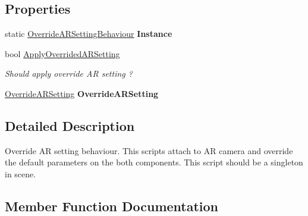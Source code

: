 \subsection*{Properties}
\begin{DoxyCompactItemize}
\item 
\mbox{\label{class_ximmerse_1_1_slide_in_s_d_k_1_1_override_a_r_setting_behaviour_a404805032e84b1cb04fb95e196e51f42}} 
static \mbox{\hyperlink{class_ximmerse_1_1_slide_in_s_d_k_1_1_override_a_r_setting_behaviour}{Override\+A\+R\+Setting\+Behaviour}} {\bfseries Instance}
\item 
bool \mbox{\hyperlink{class_ximmerse_1_1_slide_in_s_d_k_1_1_override_a_r_setting_behaviour_a0e54e87a54de821cf2b3f07fe7b93398}{Apply\+Overrided\+A\+R\+Setting}}
\begin{DoxyCompactList}\small\item\em Should apply override AR setting ? \end{DoxyCompactList}\item 
\mbox{\label{class_ximmerse_1_1_slide_in_s_d_k_1_1_override_a_r_setting_behaviour_ab186d144aee8aca46c1d9ddfced772e4}} 
\mbox{\hyperlink{class_ximmerse_1_1_slide_in_s_d_k_1_1_override_a_r_setting}{Override\+A\+R\+Setting}} {\bfseries Override\+A\+R\+Setting}
\end{DoxyCompactItemize}


\subsection{Detailed Description}
Override AR setting behaviour. This scripts attach to AR camera and override the default parameters on the both components. This script should be a singleton in scene. 



\subsection{Member Function Documentation}
\mbox{\label{class_ximmerse_1_1_slide_in_s_d_k_1_1_override_a_r_setting_behaviour_af951092941f5e3c916ef4e4f358cb4ff}} 
